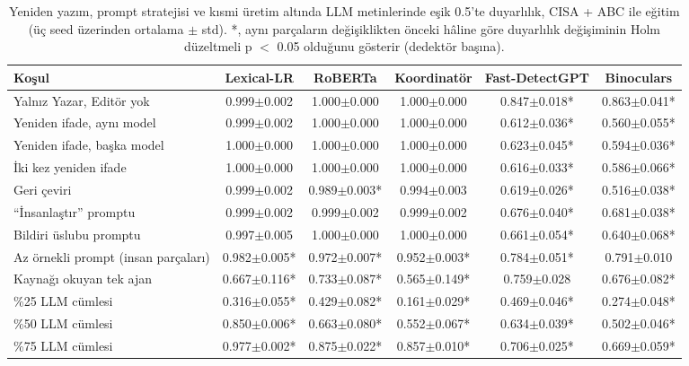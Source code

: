 \begin{table}[t]
\centering
\footnotesize
\caption{Yeniden yazım, prompt stratejisi ve kısmi üretim altında LLM metinlerinde eşik 0.5'te duyarlılık, CISA + ABC ile eğitim (üç seed üzerinden ortalama $\pm$ std). *, aynı parçaların değişiklikten önceki hâline göre duyarlılık değişiminin Holm düzeltmeli p $<$ 0.05 olduğunu gösterir (dedektör başına).}
\label{tab:robustness}
\begin{tabular}{lccccc}
\toprule
Koşul & Lexical-LR & RoBERTa & Koordinatör & Fast-DetectGPT & Binoculars \\
\midrule
Yalnız Yazar, Editör yok & 0.999$\pm$0.002 & 1.000$\pm$0.000 & 1.000$\pm$0.000 & 0.847$\pm$0.018* & 0.863$\pm$0.041* \\
Yeniden ifade, aynı model & 0.999$\pm$0.002 & 1.000$\pm$0.000 & 1.000$\pm$0.000 & 0.612$\pm$0.036* & 0.560$\pm$0.055* \\
Yeniden ifade, başka model & 1.000$\pm$0.000 & 1.000$\pm$0.000 & 1.000$\pm$0.000 & 0.623$\pm$0.045* & 0.594$\pm$0.036* \\
İki kez yeniden ifade & 1.000$\pm$0.000 & 1.000$\pm$0.000 & 1.000$\pm$0.000 & 0.616$\pm$0.033* & 0.586$\pm$0.066* \\
Geri çeviri & 0.999$\pm$0.002 & 0.989$\pm$0.003* & 0.994$\pm$0.003 & 0.619$\pm$0.026* & 0.516$\pm$0.038* \\
``İnsanlaştır'' promptu & 0.999$\pm$0.002 & 0.999$\pm$0.002 & 0.999$\pm$0.002 & 0.676$\pm$0.040* & 0.681$\pm$0.038* \\
Bildiri üslubu promptu & 0.997$\pm$0.005 & 1.000$\pm$0.000 & 1.000$\pm$0.000 & 0.661$\pm$0.054* & 0.640$\pm$0.068* \\
Az örnekli prompt (insan parçaları) & 0.982$\pm$0.005* & 0.972$\pm$0.007* & 0.952$\pm$0.003* & 0.784$\pm$0.051* & 0.791$\pm$0.010 \\
Kaynağı okuyan tek ajan & 0.667$\pm$0.116* & 0.733$\pm$0.087* & 0.565$\pm$0.149* & 0.759$\pm$0.028 & 0.676$\pm$0.082* \\
\%25 LLM cümlesi & 0.316$\pm$0.055* & 0.429$\pm$0.082* & 0.161$\pm$0.029* & 0.469$\pm$0.046* & 0.274$\pm$0.048* \\
\%50 LLM cümlesi & 0.850$\pm$0.006* & 0.663$\pm$0.080* & 0.552$\pm$0.067* & 0.634$\pm$0.039* & 0.502$\pm$0.046* \\
\%75 LLM cümlesi & 0.977$\pm$0.002* & 0.875$\pm$0.022* & 0.857$\pm$0.010* & 0.706$\pm$0.025* & 0.669$\pm$0.059* \\
\bottomrule
\end{tabular}
\end{table}
